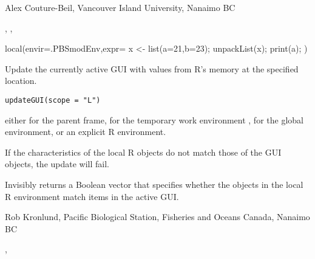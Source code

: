 \documentclass[letterpaper]{book}
\begin{document}
%
\begin{Author}\relax
Alex Couture-Beil, Vancouver Island University, Nanaimo BC
\end{Author}
%
\begin{SeeAlso}\relax
{}, , 
\end{SeeAlso}
%
\begin{Examples}
\begin{ExampleCode}
local(envir=.PBSmodEnv,expr={
  x <- list(a=21,b=23);
  unpackList(x);
  print(a);
})
\end{ExampleCode}
\end{Examples}
%
\begin{Description}\relax
Update the currently active GUI with values from R's memory at the specified location.
\end{Description}
%
\begin{Usage}
\begin{verbatim}
updateGUI(scope = "L")
\end{verbatim}
\end{Usage}
%
\begin{Arguments}
\begin{ldescription}
\item[\code{scope}] either  for the parent frame,  for
the temporary work environment ,  for
the global environment, or an explicit R environment.
\end{ldescription}
\end{Arguments}
%
\begin{Details}\relax
If the characteristics of the local R objects do not match those of the GUI objects,
the update will fail.
\end{Details}
%
\begin{Value}
Invisibly returns a Boolean vector that specifies whether the objects in the local R
environment match items in the active GUI.
\end{Value}
%
\begin{Author}\relax
Rob Kronlund, Pacific Biological Station, Fisheries and Oceans Canada, Nanaimo BC
\end{Author}
%
\begin{SeeAlso}\relax
{}, 
\end{SeeAlso}
\end{document}
